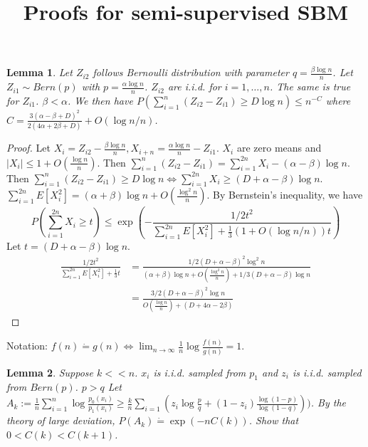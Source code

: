 \documentclass{article}
\title{Proofs for semi-supervised SBM}
\newtheorem{lemma}{Lemma}
\begin{document}
\maketitle
\begin{lemma}
Let $Z_{i2}$ follows Bernoulli distribution with parameter $q=\frac{\beta \log n }{n}$.
Let $Z_{i1} \sim Bern(p)$ with $p=\frac{\alpha \log n }{n}$. $Z_{i2}$ are i.i.d. for $i=1,\dots, n$.
The same is true for $Z_{i1}$. $\beta < \alpha$.
We then have $P(\sum_{i=1}^{n} (Z_{i2} - Z_{i1}) \geq  D \log n) \leq n^{-C}$
where $C=\frac{3(\alpha - \beta + D)^2}{2(4\alpha + 2\beta + D)} + O(\log n /n)$.
\end{lemma}
\begin{proof}
	Let $X_i = Z_{i2} - \frac{\beta \log n }{n}, X_{i+n} = \frac{\alpha \log n }{n} - Z_{i1}$.
	$X_i$ are zero means and $|X_i| \leq 1 + O(\frac{\log n}{n})$.
	Then $\sum_{i=1}^{n} (Z_{i2} - Z_{i1}) = \sum_{i=1}^{2n} X_{i} - (\alpha - \beta)\log n $.
	Then $\sum_{i=1}^{n} (Z_{i2} - Z_{i1}) \geq D \log n \iff \sum_{i=1}^{2n} X_{i} \geq (D + \alpha - \beta)\log n$.
	$\sum_{i=1}^{2n} E[X_i^2] = (\alpha + \beta)\log n + O(\frac{\log^2 n}{n})$.
	By Bernstein's inequality, we have
	$$
	P(\sum_{i=1}^{2n} X_{i}  \geq t) \leq \exp(-\frac{1/2 t^2}{\sum_{i=1}^{2n} E[X_i^2] + \frac{1}{3}(1+O(\log n /n))t})
	$$
	Let $t=(D + \alpha - \beta)\log n$.
	\begin{align}
	\frac{1/2 t^2}{\sum_{i=1}^{2n} E[X_i^2] + \frac{1}{3}t} & 
	= \frac{1/2(D + \alpha - \beta)^2\log^2 n}{(\alpha + \beta)\log n + O(\frac{\log^2 n}{n}) + 1/3(D + \alpha - \beta)\log n } \\
	 & =\frac{3/2(D + \alpha - \beta)^2\log n}{O(\frac{\log n}{n}) + (D + 4\alpha - 2\beta) }
	\end{align}
\end{proof}
Notation: $f(n)\dot{=} g(n) \iff \lim_{n\to \infty} \frac{1}{n} \log \frac{f(n)}{g(n)} = 1$.
\begin{lemma}
	Suppose $k << n$. $x_i$ is i.i.d. sampled from $p_1$ and $z_i$ is i.i.d. sampled from $Bern(p)$.
	$p > q$
Let $A_k := \frac{1}{n}\sum_{i=1}^n \log \frac{p_0(x_i)}{p_1(x_i)} \geq \frac{k}{n} \sum_{i=1}(z_i \log\frac{p}{q} +(1-z_i) \frac{\log(1-p)}{\log(1-q)}))$.
By the theory of large deviation, $P(A_k) \dot{=} \exp(-n C(k))$. Show that $0 < C(k) < C(k+1)$.
\end{lemma}
\end{document}
